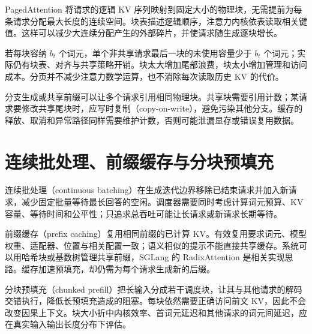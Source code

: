 PagedAttention 将请求的逻辑 KV 序列映射到固定大小的物理块，无需提前为每条请求分配最大长度的连续空间\cite{paged}。块表描述逻辑顺序，注意力内核依表读取相关键值。这样可以减少大连续分配产生的外部碎片，并使请求随生成逐块增长。

若每块容纳 $b_t$ 个词元，单个非共享请求最后一块的未使用容量少于 $b_t$ 个词元；实际仍有块表、对齐与共享策略开销。块太大增加尾部浪费，块太小增加管理和访问成本。分页并不减少注意力数学运算，也不消除每次读取历史 KV 的代价。

分支生成或共享前缀可以让多个请求引用相同物理块。共享块需要引用计数；某请求要修改共享尾块时，应写时复制（copy-on-write），避免污染其他分支。缓存的释放、取消和异常路径同样需要维护计数，否则可能泄漏显存或错误复用数据。

\section{连续批处理、前缀缓存与分块预填充}

连续批处理（continuous batching）在生成迭代边界移除已结束请求并加入新请求，减少固定批量等待最长回答的空闲。调度器需要同时考虑计算词元预算、KV 容量、等待时间和公平性；只追求总吞吐可能让长请求或新请求长期等待。

前缀缓存（prefix caching）复用相同前缀的已计算 KV。有效复用要求词元、模型权重、适配器、位置与相关配置一致；语义相似的提示不能直接共享缓存。系统可以用哈希块或基数树管理共享前缀，SGLang 的 RadixAttention 是相关实现思路\cite{sglang}。缓存加速预填充，却仍需为每个请求生成新的后缀。

分块预填充（chunked prefill）把长输入分成若干调度块，让其与其他请求的解码交错执行，降低长预填充造成的阻塞。每块依然需要正确访问前文 KV，因此不会改变因果上下文。块大小折中内核效率、首词元延迟和其他请求的词元间延迟，应在真实输入输出长度分布下评估。

